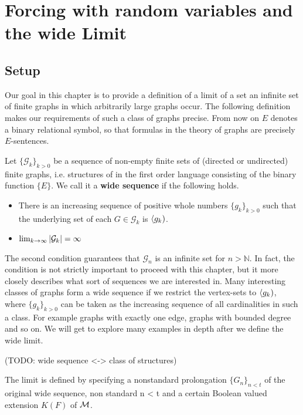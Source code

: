 \chapter{Forcing with random variables and the wide Limit}\label{chapwidelimit}
\section{Setup}

Our goal in this chapter is to provide a definition of a limit of a set an infinite set of finite graphs in which arbitrarily large graphs occur. The following definition makes our requirements of such a class of graphs precise. From now on $E$ denotes a binary relational symbol, so that formulas in the theory of graphs are precisely $E$-sentences.

\begin{defi}
Let $\{\mathcal{G}_k\}_{k>0}$ be a sequence of non-empty finite sets of (directed or undirected) finite graphs, i.e. structures of in the first order language consisting of the binary function $\{E\}$. We call it a \textbf{wide sequence} if the following holds.

\begin{itemize}
\item There is an increasing sequence of positive whole numbers $\{g_k\}_{k>0}$ such that the underlying set of each $G\in\mathcal{G}_k$ is $\langle g_k)$.
\item $\lim_{k\to\infty} \left|{\mathcal{G}_k}\right|=\infty$
\end{itemize}
\end{defi}

The second condition guarantees that $\mathcal{G}_n$ is an infinite set for $n>\mathbb{N}$. In fact, the condition is not strictly important to proceed with this chapter, but it more closely describes what sort of sequences we are interested in. Many interesting classes of graphs form a wide sequence if we restrict the vertex-sets to $\langle g_k)$, where $\{g_k\}_{k>0}$ can be taken as the increasing sequence of all cardinalities in such a class. For example graphs with exactly one edge, graphs with bounded degree and so on. We will get to explore many examples in depth after we define the wide limit.

(TODO: wide sequence <-> class of structures)

 The limit is defined by specifying a nonstandard prolongation $\{G_n\}_{n<t}$ of the original wide sequence, non standard n < t and a certain Boolean valued extension $K(F)$ of $\cal M$. 

